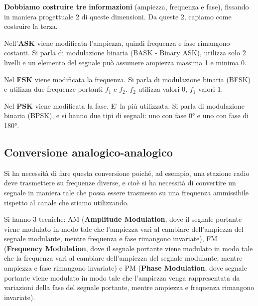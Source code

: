         \textbf{Dobbiamo costruire tre informazioni} (ampiezza, frequenza e fase), fissando in maniera progettuale 2 di queste dimensioni. Da queste 2, capiamo come costruire la terza. 
        
        \vspace{3mm}
        
        Nell'\textbf{ASK} viene modificata l'ampiezza, quindi frequenza e fase rimangono costanti. Si parla di modulazione binaria (BASK - Binary ASK), utilizza solo 2 livelli e un elemento del segnale può assumere ampiezza massima 1 e minima 0.
        
        \vspace{3mm}
        
        Nel \textbf{FSK} viene modificata la frequenza. Si parla di modulazione binaria (BFSK) e utilizza due frequenze portanti $f_1$ e $f_2$. $f_2$ utilizza valori 0, $f_1$ valori 1.
        
        \vspace{3mm}
        
        Nel \textbf{PSK} viene modificata la fase. E' la più utilizzata. Si parla di modulazione binaria (BPSK), e si hanno due tipi di segnali: uno con fase 0° e uno con fase di 180°.
        
    \subsection{Conversione analogico-analogico}
    
        Si ha necessità di fare questa conversione poiché, ad esempio, una stazione radio deve trasmettere su frequenze diverse, e cioè si ha necessità di convertire un segnale in maniera tale che possa essere trasmesso su una frequenza ammissibile rispetto al canale che stiamo utilizzando. 
        
        Si hanno 3 tecniche: AM (\textbf{Amplitude Modulation}, dove il segnale portante viene modulato in modo tale che l'ampiezza vari al cambiare dell'ampiezza del segnale modulante, mentre frequenza e fase rimangono invariate), FM (\textbf{Frequency Modulation}, dove il segnale portante viene modulato in modo tale che la frequenza vari al cambiare dell'ampiezza del segnale modulante, mentre ampiezza e fase rimangono invariate) e PM (\textbf{Phase Modulation}, dove segnale portante viene modulato in modo tale che l'ampiezza venga rappresentata da variazioni della fase del segnale portante, mentre ampiezza e frequenza rimangono invariate). 
        
